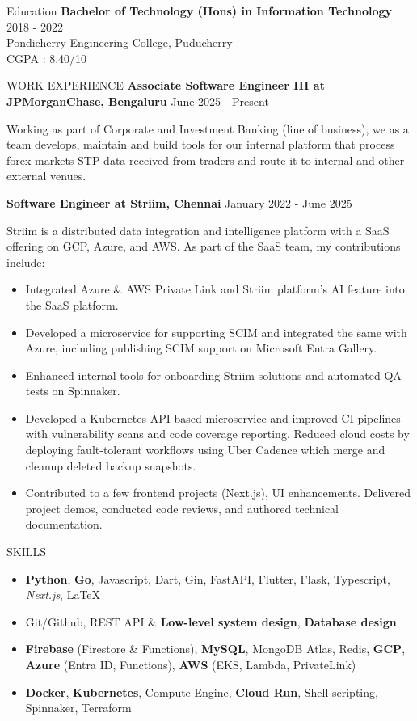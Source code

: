 \documentclass{template}
\begin{document}
\begin{rSection}{Education}
{\bf Bachelor of Technology (Hons) in Information Technology} \hfill {2018 - 2022} \\ 
Pondicherry Engineering College, Puducherry \\
CGPA : 8.40/10
\end{rSection}

\begin{rSection}{WORK EXPERIENCE}
\textbf{Associate Software Engineer III at JPMorganChase, Bengaluru}
\hfill June 2025 - Present 

Working as part of Corporate and Investment Banking (line of business), we as a team develops, maintain and build tools for our internal platform that process forex markets STP data received from traders and route it to internal and other external venues.

\textbf{Software Engineer at Striim, Chennai} \hfill January 2022 - June 2025

Striim is a distributed data integration and intelligence platform with a SaaS offering on GCP, Azure, and AWS. As part of the SaaS team, my contributions include:
\begin{itemize}
\setlength{\parskip}{0pt}
\item Integrated Azure \& AWS Private Link and Striim platform's AI feature into the SaaS platform.
\item Developed a microservice for supporting SCIM and integrated the same with Azure, including publishing SCIM support on Microsoft Entra Gallery.
\item Enhanced internal tools for onboarding Striim solutions and automated QA tests on Spinnaker.
\item Developed a Kubernetes API-based microservice and improved CI pipelines with vulnerability scans and code coverage reporting. Reduced cloud costs by deploying fault-tolerant workflows using Uber Cadence which merge and cleanup deleted backup snapshots.
\item Contributed to a few frontend projects (Next.js), UI enhancements. Delivered project demos, conducted code reviews, and authored technical documentation.
\end{itemize}
\end{rSection} 

\begin{rSection}{SKILLS}
\begin{itemize}
\setlength{\parskip}{0pt}
\item \textbf{Python}, \textbf{Go}, Javascript, Dart, Gin, FastAPI, Flutter, Flask, Typescript, \textit{Next.js}, \LaTeX    
\item Git/Github, REST API \& \textbf{Low-level system design}, \textbf{Database design}
\item \textbf{Firebase} (Firestore \& Functions), \textbf{MySQL}, MongoDB Atlas, Redis, \textbf{GCP}, \textbf{Azure} (Entra ID, Functions), \textbf{AWS} (EKS, Lambda, PrivateLink)\item \textbf{Docker}, \textbf{Kubernetes}, Compute Engine, \textbf{Cloud Run}, Shell scripting, Spinnaker, Terraform
\end{itemize}
\end{rSection}
\end{document}
